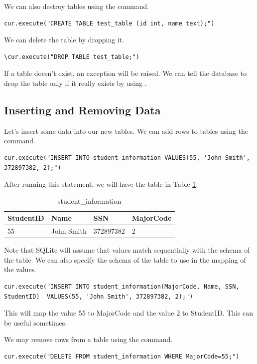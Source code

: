 We can also destroy tables using the  command.
\begin{lstlisting}
cur.execute("CREATE TABLE test_table (id int, name text);")
\end{lstlisting}
We can delete the table by dropping it.
\begin{lstlisting}
\cur.execute("DROP TABLE test_table;")
\end{lstlisting}
If a table doesn't exist, an exception will be raised.
We can tell the database to drop the table only if it really exists by using .

\subsection*{Inserting and Removing Data}
Let's insert some data into our new tables.
We can add rows to tables using the  command.
\begin{lstlisting}
cur.execute("INSERT INTO student_information VALUES(55, 'John Smith', 372897382, 2);")
\end{lstlisting}
After running this statement, we will have the table in Table \ref{table:student_information1}.
\begin{table}
\begin{tabular}{|l|l|l|l|}
\hline
StudentID & Name & SSN & MajorCode \\
\hline
55 & John Smith & 372897382 & 2 \\
\hline
\end{tabular}
\caption{student\_information}
\label{table:student_information1}
\end{table}

Note that SQLite will assume that values match sequentially with the schema of the table.
We can also specify the schema of the table to use in the mapping of the values.
\begin{lstlisting}
cur.execute("INSERT INTO student_information(MajorCode, Name, SSN, StudentID)  VALUES(55, 'John Smith', 372897382, 2);")
\end{lstlisting}
This will map the value 55 to MajorCode and the value 2 to StudentID.  This can be useful sometimes.

We may remove rows from a table using the  command.
\begin{lstlisting}
cur.execute("DELETE FROM student_information WHERE MajorCode=55;")
\end{lstlisting}

